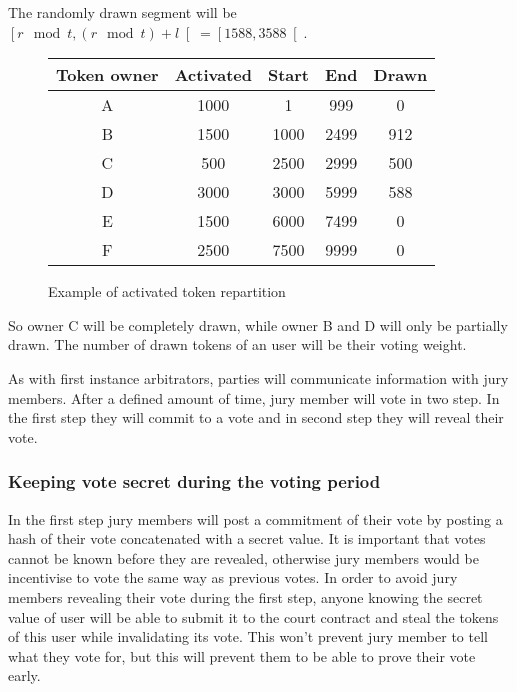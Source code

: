 \documentclass[12 pt]{article}
\begin{document}
The randomly drawn segment will be $\left[r \mod t, (r \mod t) + l \right[ = \left[1588, 3588 \right[$.

\begin{figure}[h!]
\label{repartition}
\begin{center}
   \begin{tabular}{ | c | c | c | c | c |}
     \hline
     Token owner & Activated & Start & End  & Drawn  \\ \hline
     A & 1000 & 1 & 999 & 0 \\ \hline
     B & 1500 & 1000 & 2499 & 912 \\ \hline
     C & 500 & 2500 & 2999 & 500 \\ \hline
     D & 3000 & 3000 & 5999 & 588 \\ \hline
     E & 1500 & 6000 & 7499 & 0 \\ \hline
     F & 2500 & 7500 & 9999 & 0 \\ \hline
   \end{tabular}
 \end{center}
   \caption{Example of activated token repartition}
\end{figure}

So owner C will be completely drawn, while owner B and D will only be partially drawn. The number of drawn tokens of an user will be their voting weight.

As with first instance arbitrators, parties will communicate information with jury members. After a defined amount of time, jury member will vote in two step. In the first step they will commit to a vote and in second step they will reveal their vote.

\subsubsection{Keeping vote secret during the voting period}

In the first step jury members will post a commitment of their vote by posting a hash of their vote concatenated with a secret value.
It is important that votes cannot be known before they are revealed, otherwise jury members would be incentivise to vote the same way as previous votes.
In order to avoid jury members revealing their vote during the first step, anyone knowing the secret value of user will be able to submit it to the court contract and steal the tokens of this user while invalidating its vote.
This won't prevent jury member to tell what they vote for, but this will prevent them to be able to prove their vote early.
\end{document}

